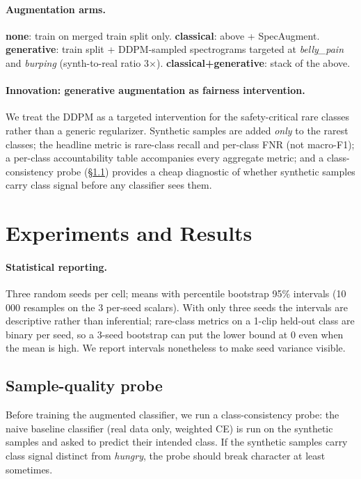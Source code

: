 \documentclass[pmlr,twocolumn,10pt]{jmlr}
\begin{document}
\paragraph{Augmentation arms.}
\textbf{none}: train on merged train split only.
\textbf{classical}: above + SpecAugment.
\textbf{generative}: train split + DDPM-sampled spectrograms targeted at \textit{belly\_pain} and \textit{burping} (synth-to-real ratio 3$\times$).
\textbf{classical+generative}: stack of the above.

\paragraph{Innovation: generative augmentation as fairness intervention.} We treat the DDPM as a targeted intervention for the safety-critical rare classes rather than a generic regularizer. Synthetic samples are added \emph{only} to the rarest classes; the headline metric is rare-class recall and per-class FNR (not macro-F1); a per-class accountability table accompanies every aggregate metric; and a class-consistency probe (\S\ref{sec:probe}) provides a cheap diagnostic of whether synthetic samples carry class signal before any classifier sees them.

\section{Experiments and Results}\label{sec:expts}

\paragraph{Statistical reporting.} Three random seeds per cell; means with percentile bootstrap 95\% intervals \citep{efron1986bootstrap} (10\,000 resamples on the 3 per-seed scalars). With only three seeds the intervals are descriptive rather than inferential; rare-class metrics on a 1-clip held-out class are binary per seed, so a 3-seed bootstrap can put the lower bound at 0 even when the mean is high. We report intervals nonetheless to make seed variance visible.

\subsection{Sample-quality probe}\label{sec:probe}
Before training the augmented classifier, we run a class-consistency probe: the naive baseline classifier (real data only, weighted CE) is run on the synthetic samples and asked to predict their intended class. If the synthetic samples carry class signal distinct from \textit{hungry}, the probe should break character at least sometimes.
\end{document}
